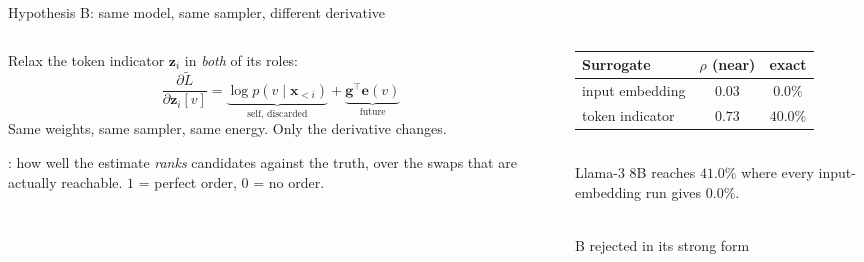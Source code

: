 \documentclass{beamer}
\begin{document}
\begin{frame}{Hypothesis B: same model, same sampler, different derivative}
  \begin{columns}[T]
    \begin{column}{0.5\textwidth}
      \small Relax the token indicator $\bm{z}_i$ in \emph{both} of its roles:
      \[ \frac{\partial \tilde{L}}{\partial \bm{z}_i[v]} = \underbrace{\log p(v\mid \bm{x}_{<i})}_{\text{self, discarded}} + \underbrace{\bm{g}^\top \bm{e}(v)}_{\text{future}} \]
      {\small Same weights, same sampler, same energy. Only the derivative changes.}
      \vspace{0.5em}

      {\scriptsize {}: how well the estimate \emph{ranks} candidates against
      the truth, over the swaps that are actually reachable. $1$ = perfect order, $0$ = no order.}
    \end{column}
    \begin{column}{0.5\textwidth}
      \small
      \begin{tabular}{lcc}
        \toprule
        Surrogate & $\rho$ (near) & exact \\
        \midrule
        input embedding & $0.03$ & $0.0\%$ \\
        token indicator & $\mathbf{0.73}$ & $\mathbf{40.0\%}$ \\
        \bottomrule
      \end{tabular}
      \\[0.5em]{\scriptsize Llama-3 8B reaches $41.0\%$ where every input-embedding run gives $0.0\%$.}
      \vspace{0.8em}
      \begin{center}\\{\footnotesize B rejected in its strong form}\end{center}
    \end{column}
  \end{columns}
\end{frame}
\end{document}
